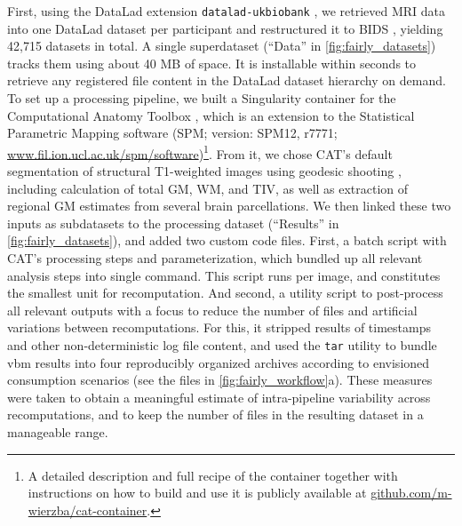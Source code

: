 First, using the DataLad extension \texttt{datalad-ukbiobank} \citep{hanke_michael_2022_7296550}, we retrieved \gls{MRI} data into one DataLad dataset per participant and restructured it to BIDS \citep{gorgolewski2016brain}, yielding 42,715 datasets in total.
A single superdataset (``Data'' in \cref{fig:fairly_datasets}) tracks them using about 40 MB of space.
It is installable within seconds to retrieve any registered file content in the DataLad dataset hierarchy on demand.\\
To set up a processing pipeline, we built a Singularity container for the Computational Anatomy Toolbox \citep[CAT; version: CAT12.7-RC2, r1720]{gaser}, which is an extension to the Statistical Parametric Mapping software (SPM; version: SPM12, r7771; \url{www.fil.ion.ucl.ac.uk/spm/software})\footnote{A detailed description and full recipe of the container together with instructions on how to build and use it is publicly available at \url{github.com/m-wierzba/cat-container}.}.
From it, we chose \gls{CAT}'s default segmentation of structural T1-weighted images using geodesic shooting \citep{ashburner2011diffeomorphic}, including calculation of total \gls{GM}, \gls{WM}, and \gls{TIV}, as well as extraction of regional \gls{GM} estimates from several brain parcellations.
We then linked these two inputs as subdatasets to the processing dataset (``Results'' in \cref{fig:fairly_datasets}), and added two custom code files.
First, a batch script with \gls{CAT}'s processing steps and parameterization, which bundled up all relevant analysis steps into single command.
This script runs per image, and constitutes the smallest unit for recomputation.
And second, a utility script to post-process all relevant outputs with a focus to reduce the number of files and artificial variations between recomputations.
For this, it stripped results of timestamps and other non-deterministic log file content, and used the \texttt{tar} utility to bundle \gls{vbm} results into four reproducibly organized archives according to envisioned consumption scenarios (see the files in \cref{fig:fairly_workflow}a).
These measures were taken to obtain a meaningful estimate of intra-pipeline variability across recomputations, and to keep the number of files in the resulting dataset in a manageable range.\\
